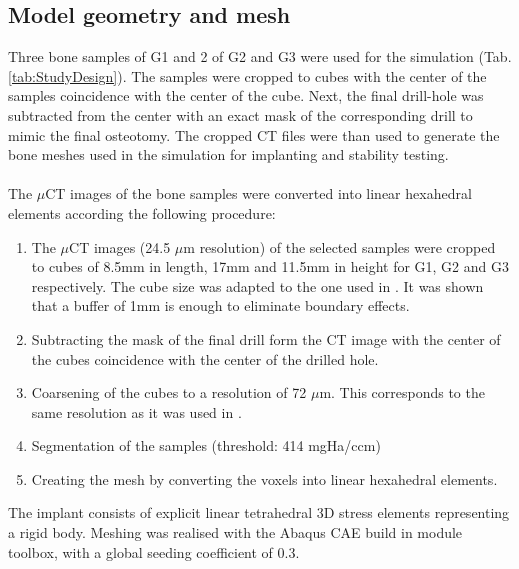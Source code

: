 \documentclass[12pt, a4paper, twoside]{report}
\begin{document}
\subsection{Model geometry and mesh}
%
Three bone samples of G1 and 2 of G2 and G3 were used for the simulation (Tab. \ref{tab:StudyDesign}). The samples were cropped to cubes with the center of the samples coincidence with the center of the cube. Next, the final drill-hole was subtracted from the center with an exact mask of the corresponding drill to mimic the final osteotomy. The cropped CT files were than used to generate the bone meshes used in the simulation for implanting and stability testing.\\
\\
The \(\mu\)CT images of the bone samples were converted into linear hexahedral elements according the following procedure:
\begin{enumerate}
	\item The \(\mu\)CT images (24.5 \(\mu\)m resolution) of the selected samples were cropped to cubes of 8.5mm in length, 17mm and 11.5mm in height for G1, G2 and G3 respectively. The cube size was adapted to the one used in \cite{Ovesy_2019_JMechBehavBiomedMater}. It was shown that a buffer of 1mm is enough to eliminate boundary effects.
	\item Subtracting the mask of the final drill form the CT image with the center of the cubes coincidence with the center of the drilled hole.
	\item Coarsening of the cubes to a resolution of 72 $\mu$m. This corresponds to the same resolution as it was used in \cite{Ovesy_2019_JMechBehavBiomedMater}.
	\item Segmentation of the samples (threshold: 414 mgHa/ccm)
	\item Creating the mesh by converting the voxels into linear hexahedral elements.
\end{enumerate}
%
The implant consists of explicit linear tetrahedral 3D stress elements representing a rigid body. Meshing was realised with the Abaqus CAE build in module toolbox, with a global seeding coefficient of 0.3.
%
\end{document}
